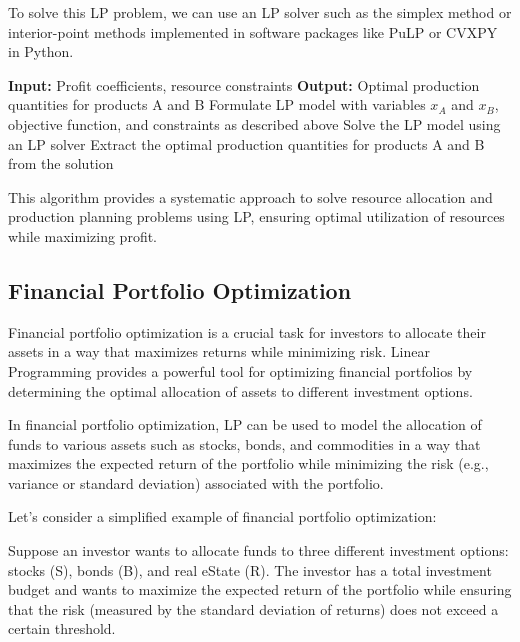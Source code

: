 \documentclass[12pt]{book} %
\begin{document}
To solve this LP problem, we can use an LP solver such as the simplex method or interior-point methods implemented in software packages like PuLP or CVXPY in Python.

\FloatBarrier
\begin{algorithm}
    \caption{Resource Allocation and Production Planning using Linear Programming}
    \begin{algorithmic}[1]
        \State \textbf{Input:} Profit coefficients, resource constraints
        \State \textbf{Output:} Optimal production quantities for products A and B
        \State Formulate LP model with variables \(x_A\) and \(x_B\), objective function, and constraints as described above
        \State Solve the LP model using an LP solver
        \State Extract the optimal production quantities for products A and B from the solution
    \end{algorithmic}
\end{algorithm}
\FloatBarrier

This algorithm provides a systematic approach to solve resource allocation and production planning problems using LP, ensuring optimal utilization of resources while maximizing profit.

\subsection{Financial Portfolio Optimization}

Financial portfolio optimization is a crucial task for investors to allocate their assets in a way that maximizes returns while minimizing risk. Linear Programming provides a powerful tool for optimizing financial portfolios by determining the optimal allocation of assets to different investment options.

In financial portfolio optimization, LP can be used to model the allocation of funds to various assets such as stocks, bonds, and commodities in a way that maximizes the expected return of the portfolio while minimizing the risk (e.g., variance or standard deviation) associated with the portfolio.

Let's consider a simplified example of financial portfolio optimization:

Suppose an investor wants to allocate funds to three different investment options: stocks (S), bonds (B), and real eState (R). The investor has a total investment budget and wants to maximize the expected return of the portfolio while ensuring that the risk (measured by the standard deviation of returns) does not exceed a certain threshold.
\end{document}

